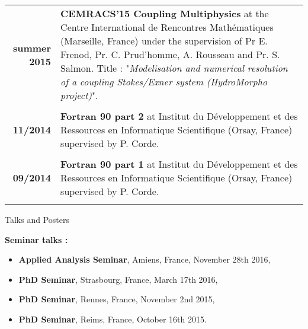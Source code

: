 \documentclass[10pt,a4paper]{report}
\begin{document}
\begin{center}
\begin{tabular}{r p{12cm}}
\textbf{summer 2015} & \textbf{CEMRACS'15 Coupling Multiphysics} at the Centre International de Rencontres Mathématiques (Marseille, France) under the supervision of Pr E. Frenod, Pr. C. Prud'homme, A. Rousseau and Pr. S. Salmon.\newline
Title : "\textit{Modelisation and numerical resolution of a coupling Stokes/Exner system (HydroMorpho project)}".\\

& \\

\textbf{11/2014} & \textbf{Fortran 90 part 2} at Institut du Développement et des Ressources en Informatique Scientifique (Orsay, France) supervised by P. Corde.\\

& \\

\textbf{09/2014} & \textbf{Fortran 90 part 1} at Institut du Développement et des Ressources en Informatique Scientifique (Orsay, France) supervised by P. Corde.\\

& \\

\end{tabular}
\end{center}


\vspace{.5cm}
\newpage
\noindent
{\selectfont
\begin{Large}
Talks and Posters
\end{Large}
\hrulefill
}
\vspace{0.5cm}
\noindent

\noindent
{\selectfont
\textbf{Seminar talks :}
}

\begin{itemize}
\item \textbf{Applied Analysis Seminar}, Amiens, France, November 28th 2016,
\item \textbf{PhD Seminar}, Strasbourg, France, March 17th 2016,
\item \textbf{PhD Seminar}, Rennes, France, November 2nd 2015,
\item \textbf{PhD Seminar}, Reims, France, October 16th 2015.
\end{itemize}
\end{document}
